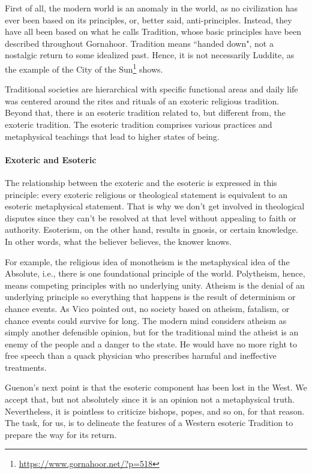 First of all, the modern world is an anomaly in the world, as no civilization has ever been based on its principles, or, better said, anti-principles. Instead, they have all been based on what he calls Tradition, whose basic principles have been described throughout Gornahoor. Tradition means ``handed down", not a nostalgic return to some idealized past. Hence, it is not necessarily Luddite, as the example of the City of the Sun\footnote{\url{https://www.gornahoor.net/?p=518}} shows.

Traditional societies are hierarchical with specific functional areas and daily life was centered around the rites and rituals of an exoteric religious tradition. Beyond that, there is an esoteric tradition related to, but different from, the exoteric tradition. The esoteric tradition comprises various practices and metaphysical teachings that lead to higher states of being.

\paragraph{Exoteric and Esoteric}
The relationship between the exoteric and the esoteric is expressed in this principle: every exoteric religious or theological statement is equivalent to an esoteric metaphysical statement. That is why we don't get involved in theological disputes since they can't be resolved at that level without appealing to faith or authority. Esoterism, on the other hand, results in gnosis, or certain knowledge. In other words, what the believer believes, the knower knows.

For example, the religious idea of monotheism is the metaphysical idea of the Absolute, i.e., there is one foundational principle of the world. Polytheism, hence, means competing principles with no underlying unity. Atheism is the denial of an underlying principle so everything that happens is the result of determinism or chance events. As Vico pointed out, no society based on atheism, fatalism, or chance events could survive for long. The modern mind considers atheism as simply another defensible opinion, but for the traditional mind the atheist is an enemy of the people and a danger to the state. He would have no more right to free speech than a quack physician who prescribes harmful and ineffective treatments.

Guenon's next point is that the esoteric component has been lost in the West. We accept that, but not absolutely since it is an opinion not a metaphysical truth. Nevertheless, it is pointless to criticize bishops, popes, and so on, for that reason. The task, for us, is to delineate the features of a Western esoteric Tradition to prepare the way for its return.

